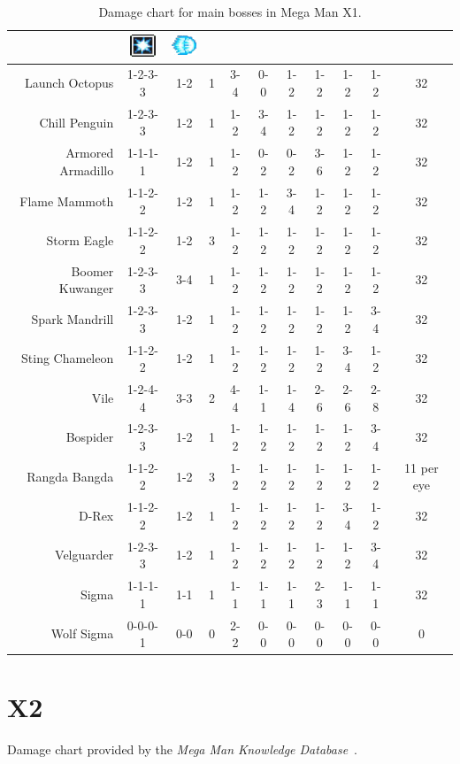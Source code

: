 \begin{table}[htp]
{\begin{tabular}{r *{10}{c}}
		&{\includegraphics[width=30px, height=25px]{figures/X1/weapons/S_ice.jpg}} &{\includegraphics[width=30px, height=25px]{figures/X1/weapons/hadoken_sprite.png}}\\
		\midrule
		Launch Octopus&	 	1-2-3-3& 1-2& 1 & 3-4& 0-0& 1-2& 1-2& 1-2& 1-2& 32\\
		Chill Penguin&	 	1-2-3-3& 1-2& 1 & 1-2& 3-4& 1-2& 1-2& 1-2& 1-2& 32\\
		Armored Armadillo& 	1-1-1-1& 1-2& 1 & 1-2& 0-2& 0-2& 3-6& 1-2& 1-2& 32\\
		Flame Mammoth& 		1-1-2-2& 1-2& 1 & 1-2& 1-2& 3-4& 1-2& 1-2& 1-2& 32\\
		Storm Eagle& 		1-1-2-2& 1-2& 3 & 1-2& 1-2& 1-2& 1-2& 1-2& 1-2& 32\\
		Boomer Kuwanger&	1-2-3-3& 3-4& 1 & 1-2& 1-2& 1-2& 1-2& 1-2& 1-2& 32\\
		Spark Mandrill&		1-2-3-3& 1-2& 1 & 1-2& 1-2& 1-2& 1-2& 1-2& 3-4& 32\\
		Sting Chameleon&	1-1-2-2& 1-2& 1 & 1-2& 1-2& 1-2& 1-2& 3-4& 1-2& 32\\
		Vile &				1-2-4-4& 3-3& 2 & 4-4& 1-1& 1-4& 2-6& 2-6& 2-8& 32\\
		Bospider&			1-2-3-3& 1-2& 1 & 1-2& 1-2& 1-2& 1-2& 1-2& 3-4& 32\\
		Rangda Bangda&		1-1-2-2& 1-2& 3 & 1-2& 1-2& 1-2& 1-2& 1-2& 1-2& 11 per eye\\
		D-Rex&				1-1-2-2& 1-2& 1 & 1-2& 1-2& 1-2& 1-2& 3-4& 1-2& 32\\
		Velguarder&			1-2-3-3& 1-2& 1 & 1-2& 1-2& 1-2& 1-2& 1-2& 3-4& 32\\
		Sigma&				1-1-1-1& 1-1& 1 & 1-1& 1-1& 1-1& 2-3& 1-1& 1-1& 32\\
		Wolf Sigma&			0-0-0-1& 0-0& 0 & 2-2& 0-0& 0-0& 0-0& 0-0& 0-0& 0\\
		\bottomrule
	\end{tabular}
	}	
	\caption{Damage chart for main bosses in Mega Man X1.}
\end{table}

\newpage
\section{X2}
Damage chart provided by the \emph{Mega Man Knowledge Database}~\cite{wiki:damage_chart_X2}. 

